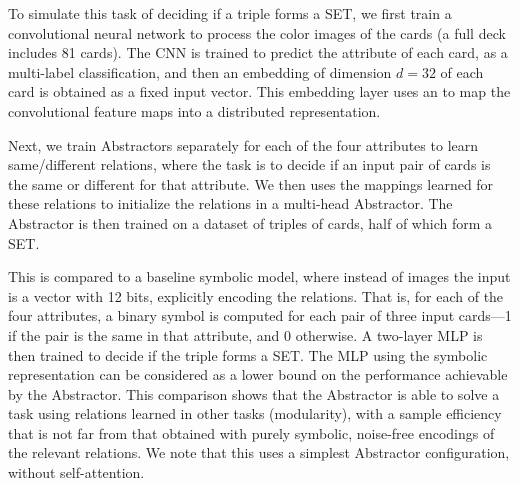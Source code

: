 To simulate this task of deciding if a triple forms a SET, we first train a convolutional neural network to process the color images of the cards (a full deck includes 81 cards). The CNN is trained to predict the attribute of
each card, as a multi-label classification, and then an embedding of dimension $d=32$ of 
each card is obtained as a fixed input vector. This embedding layer uses an \MLP{} to map the convolutional feature maps into a distributed representation.

Next, we train Abstractors separately for each of the four attributes to learn same/different 
relations, where the task is to decide if an input pair of cards is the same or different for that attribute. 
We then uses the mappings learned for these relations to initialize the relations
in a multi-head Abstractor. The Abstractor is then trained on a dataset of triples of cards, half of which form a SET. 

This is compared to a baseline symbolic model, where instead of images the input is a vector with 12 bits, explicitly encoding the relations. That is, for each of the four attributes, a binary symbol is computed for each pair of three input cards---1 if the pair is the same in that attribute, and 0 otherwise. A two-layer MLP is then trained to decide if the triple forms a SET. The MLP using the symbolic representation can be considered as a lower bound on the performance achievable by the Abstractor. This comparison shows that the Abstractor is able to solve a task using relations learned in other tasks (modularity), with a sample efficiency that is not far from that obtained 
with purely symbolic, noise-free encodings of the relevant relations. We note that this uses a simplest Abstractor configuration, without self-attention.

